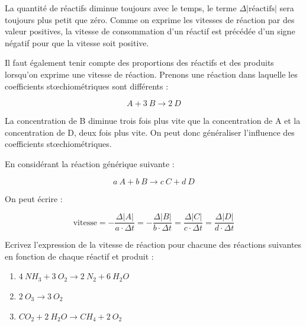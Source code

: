 \documentclass[
  11pt,
  a4paper,
  openany]{book}
\providecommand{\tightlist}{%
  \setlength{\itemsep}{0pt}\setlength{\parskip}{0pt}}
\begin{document}
La quantité de réactifs diminue toujours avec le temps, le terme \(\Delta |\text{réactifs}|\) sera toujours plus petit que zéro. Comme on exprime les vitesses de réaction par des valeur positives, la vitesse de consommation d'un réactif est précédée d'un signe négatif pour que la vitesse soit positive.

Il faut également tenir compte des proportions des réactifs et des produits lorsqu'on exprime une vitesse de réaction. Prenons une réaction dans laquelle les coefficients stœchiométriques sont différents :

\[
A + 3\ B \rightarrow 2\ D
\]

La concentration de B diminue trois fois plus vite que la concentration de A et la concentration de D, deux fois plus vite. On peut donc généraliser l'influence des coefficients stœchiométriques.

\newpage

En considérant la réaction générique suivante :

\[
a\ A + b\ B \rightarrow c\ C + d\ D
\]

On peut écrire :

\[
\text{vitesse} = - \frac{\Delta |A|}{a \cdot \Delta t} = - \frac{\Delta |B|}{b \cdot \Delta t} = \frac{\Delta |C|}{c \cdot \Delta t} = \frac{\Delta |D|}{d \cdot \Delta t}
\]

\begin{Exercise}

Ecrivez l'expression de la vitesse de réaction pour chacune des réactions suivantes en fonction de chaque réactif et produit :

\begin{enumerate}
\def\labelenumi{\arabic{enumi}.}
\tightlist
\item
  \(4\ NH_3 + 3\ O_2 \rightarrow 2\ N_2 + 6\ H_2O\)
\item
  \(2\ O_3 \rightarrow 3\ O_2\)
\item
  \(CO_2 + 2\ H_2O \rightarrow CH_4 + 2\ O_2\)
\end{enumerate}

\end{Exercise}
\end{document}
